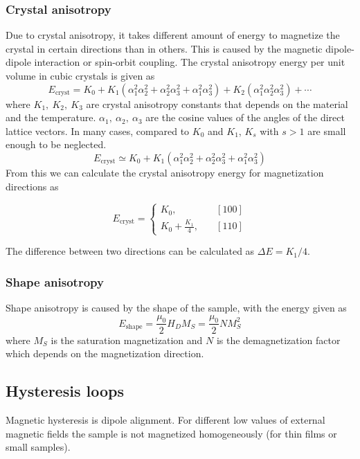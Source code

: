 \documentclass{article}
\begin{document}
\subsubsection{Crystal anisotropy}
Due to crystal anisotropy, it takes different amount of energy to magnetize the crystal in certain directions than in others. This is caused by the magnetic dipole-dipole interaction or spin-orbit coupling. The crystal anisotropy energy per unit volume in cubic crystals is given as 
\begin{equation}
    E_\text{cryst} = K_0 + K_1(\alpha_1^2\alpha_2^2 + \alpha_2^2\alpha_3^2 + \alpha_1^2\alpha_3^2) + K_2(\alpha_1^2\alpha_2^2\alpha_3^2) + \cdots
\end{equation} 
where $K_1,\ K_2,\ K_3$ are crystal anisotropy constants that depends on the material and the temperature. $\alpha_1,\ \alpha_2,\ \alpha_3$ are the cosine values of the angles of the direct lattice vectors. In many cases, compared to $K_0$ and $K_1$, $K_s$ with $s>1$ are small enough to be neglected.
\begin{equation}
    E_\text{cryst} \simeq K_0 + K_1(\alpha_1^2\alpha_2^2 + \alpha_2^2\alpha_3^2 + \alpha_1^2\alpha_3^2)
\end{equation} 
From this we can calculate the crystal anisotropy energy for magnetization directions as\\
\begin{center}
\begin{equation}
E_\text{cryst} = \left\{
        \begin{array}{ll}
            K_0, & \quad[100]\\
            K_0 + \frac{K_1}{4}, &\quad [110]
        \end{array}
    \right.
\end{equation}    
\end{center}
The difference between two directions can be calculated as $\Delta E = K_1 / 4$.
\subsubsection{Shape anisotropy}
Shape anisotropy is caused by the shape of the sample, with the energy given as
$$ E_\text{shape} = \frac{\mu_0}{2}H_DM_S = \frac{\mu_0}{2}NM_S^2$$
where $M_S$ is the saturation magnetization and $N$ is the demagnetization factor which depends on the magnetization direction.
\subsection{Hysteresis loops}
Magnetic hysteresis is dipole alignment. For different low values of external magnetic fields the sample is not magnetized homogeneously (for thin films or small samples).\\
\end{document}
